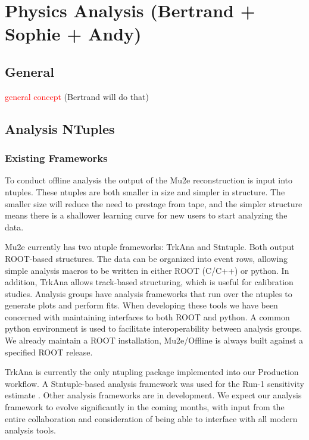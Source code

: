 \section{Physics Analysis (Bertrand + Sophie + Andy)}
\label{sec:analysis}

\subsection{General}
\textcolor{red}{general concept} (Bertrand will do that)
\subsection{Analysis NTuples}

\subsubsection{Existing Frameworks}

To conduct offline analysis the output of the Mu2e reconstruction is input into ntuples. These ntuples are both smaller in size and simpler in structure. The smaller size will reduce the need to prestage from tape, and the simpler structure means there is a shallower learning curve for new users to start analyzing the data. 

Mu2e currently has two ntuple frameworks: TrkAna and Stntuple. Both output ROOT-based structures. The data can be organized into event rows, allowing simple analysis macros to be written in either ROOT (C/C++) or python. In addition, TrkAna allows track-based structuring, which is useful for calibration studies. Analysis groups have analysis frameworks that run over the ntuples to generate plots and perform fits. When developing these tools we have been concerned with maintaining interfaces to both ROOT and python. A common python environment is used to facilitate interoperability between analysis groups. We already maintain a ROOT installation, Mu2e/Offline is always built against a specified ROOT release.

TrkAna is currently the only ntupling package implemented into our Production workflow. A Stntuple-based analysis framework was used for the Run-1 sensitivity estimate \cite{}. Other analysis frameworks are in development. We expect our analysis framework to evolve significantly in the coming months, with input from the entire collaboration and consideration of being able to interface with all modern analysis tools.

